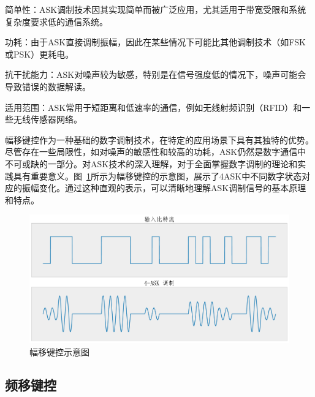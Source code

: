 简单性：ASK调制技术因其实现简单而被广泛应用，尤其适用于带宽受限和系统复杂度要求低的通信系统。

功耗：由于ASK直接调制振幅，因此在某些情况下可能比其他调制技术（如FSK或PSK）更耗电。

抗干扰能力：ASK对噪声较为敏感，特别是在信号强度低的情况下，噪声可能会导致错误的数据解读。

适用范围：ASK常用于短距离和低速率的通信，例如无线射频识别（RFID）和一些无线传感器网络。

幅移键控作为一种基础的数字调制技术，在特定的应用场景下具有其独特的优势。尽管存在一些局限性，如对噪声的敏感性和较高的功耗，ASK仍然是数字通信中不可或缺的一部分。对ASK技术的深入理解，对于全面掌握数字调制的理论和实践具有重要意义。图~\ref{fig:ASK}所示为幅移键控的示意图，展示了4ASK中不同数字状态对应的振幅变化。通过这种直观的表示，可以清晰地理解ASK调制信号的基本原理和特点。

\begin{figure}[htbp]
    \centering
    \includegraphics[width=\textwidth]{Image/ask.pdf}
    \caption{幅移键控示意图}
    \label{fig:ASK}
\end{figure}


\subsection{频移键控}\label{sec:background}

